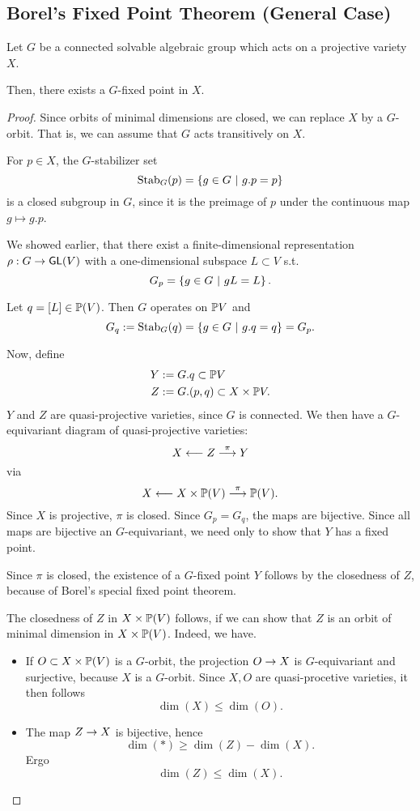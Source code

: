 \subsection{Borel's Fixed Point Theorem (General Case)}

\begin{theorem}
	Let $G$ be a connected solvable algebraic group which acts on a projective variety $X$.
	
	Then, there exists a $G$-fixed point in $X$.
\end{theorem}
\begin{proof}
	Since orbits of minimal dimensions are closed, we can replace $X$ by a $G$-orbit. That is, we can assume that $G$ acts transitively on $X$.
	
	For $p \in X$, the $G$-stabilizer set
	\[ \mathrm{Stab}_G(p) = \set{g \in G}{g.p = p} \]
	is a closed subgroup in $G$, since it is the preimage of $p$ under the continuous map $g\mapsto g.p$.
	
	We showed earlier, that there exist a finite-dimensional representation $\rho : G \pfeil{} \GL(V)$ with a one-dimensional subspace $L \subset V$ s.t.
	\[ G_p = \set{ g \in G}{gL = L}. \]
	
	Let $q = [L] \in \P(V)$. Then $G$ operates on $\P V$ and
	\[ G_q := \mathrm{Stab}_G(q) = \set{g \in G}{g.q = q} = G_p.\]
	
	Now, define
	\begin{align*}
	Y &:= G.q \subset \P V\\
	Z&:= G.(p,q) \subset X \times \P V.
	\end{align*}
	$Y$ and $Z$ are quasi-projective varieties, since $G$ is connected. We then have a $G$-equivariant diagram of quasi-projective varieties:
	\[ X \longleftarrow Z \Pfeil{\pi} Y \]
	via
	\[ X \longleftarrow X \times \P(V) \Pfeil{\pi} \P(V). \]
	Since $X$ is projective, $\pi$ is closed. Since $G_p = G_q$, the maps are bijective.
	Since all maps are bijective an $G$-equivariant, we need only to show that $Y$ has a fixed point.
	
	Since $\pi$ is closed, the existence of a $G$-fixed point $Y$ follows by the closedness of $Z$, because of Borel's special fixed point theorem.
	
	The closedness of $Z$ in $X \times \P(V)$ follows, if we can show that $Z$ is an orbit of minimal dimension in $X\times \P(V)$.
	Indeed, we have.
	\begin{itemize}
		\item If $O \subset X \times \P(V)$ is a $G$-orbit, the projection $O \pfeil{} X$  is $G$-equivariant and surjective, because $X$ is a $G$-orbit. Since $X,O$ are quasi-procetive varieties, it then follows
		\[ \dim(X) \leq \dim(O). \]
		\item The map $Z \pfeil{} X$ is bijective, hence
		\[ \dim(*) \geq \dim(Z) - \dim (X). \]
		Ergo
		\[ \dim(Z) \leq \dim(X). \]
	\end{itemize}
\end{proof}